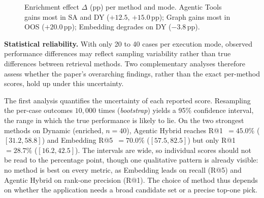 \documentclass[10pt,twocolumn]{article}
\begin{document}
\begin{figure}[t]
  \caption{Enrichment effect $\Delta$ (pp) per method and mode. Agentic Tools gains most in SA and DY ($+12.5$, $+15.0$\,pp); Graph gains most in OOS ($+20.0$\,pp); Embedding degrades on DY ($-3.8$\,pp).}
  \label{fig:delta-heatmap}
\end{figure}


\textbf{Statistical reliability.} With only 20 to 40 cases per execution mode, observed performance differences may reflect sampling variability rather than true differences between retrieval methods. Two complementary analyses therefore assess whether the paper's overarching findings, rather than the exact per-method scores, hold up under this uncertainty.

The first analysis quantifies the uncertainty of each reported score. Resampling the per-case outcomes $10{,}000$ times (\emph{bootstrap}) yields a 95\% confidence interval, the range in which the true performance is likely to lie. On the two strongest methods on Dynamic (enriched, $n{=}40$), Agentic Hybrid reaches R@1~$=45.0\%$ ($[31.2, 58.8]$) and Embedding R@5~$=70.0\%$ ($[57.5, 82.5]$) but only R@1~$=28.7\%$ ($[16.2, 42.5]$). The intervals are wide, so individual scores should not be read to the percentage point, though one qualitative pattern is already visible: no method is best on every metric, as Embedding leads on recall (R@5) and Agentic Hybrid on rank-one precision (R@1). The choice of method thus depends on whether the application needs a broad candidate set or a precise top-one pick.
\end{document}
